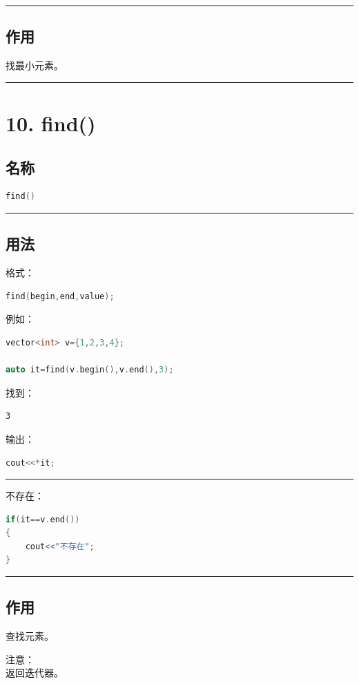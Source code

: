 \documentclass[9pt,twocolumn]{extarticle}
\begin{document}
\noindent\rule{\linewidth}{0.4pt}

\subsection{作用}
找最小元素。

\noindent\rule{\linewidth}{0.4pt}

\section{10. find()}

\subsection{名称}
\begin{lstlisting}[language=C++]
find()
\end{lstlisting}

\noindent\rule{\linewidth}{0.4pt}

\subsection{用法}
格式：
\begin{lstlisting}[language=C++]
find(begin,end,value);
\end{lstlisting}
例如：
\begin{lstlisting}[language=C++]
vector<int> v={1,2,3,4};

auto it=find(v.begin(),v.end(),3);
\end{lstlisting}
找到：
\begin{lstlisting}
3
\end{lstlisting}
输出：
\begin{lstlisting}[language=C++]
cout<<*it;
\end{lstlisting}

\noindent\rule{\linewidth}{0.4pt}

不存在：
\begin{lstlisting}[language=C++]
if(it==v.end())
{
    cout<<"不存在";
}
\end{lstlisting}

\noindent\rule{\linewidth}{0.4pt}

\subsection{作用}
查找元素。

注意：\\
返回迭代器。
\end{document}
